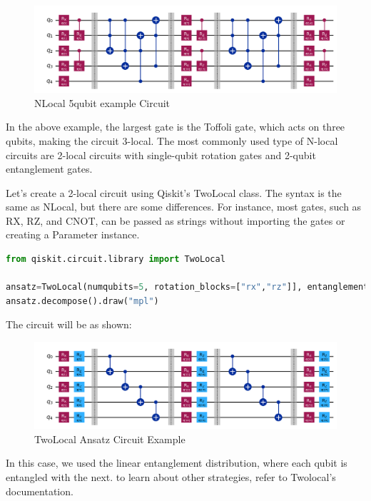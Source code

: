 \documentclass[12pt, oneside]{book}
\theoremstyle{definition}
\theoremstyle{definition}
\theoremstyle{remark}
\begin{document}
\begin{figure}[H]
    \centering
    \includegraphics[width=0.5\linewidth]{../images/5q_ansatz_ex.png}
    \caption{NLocal 5qubit example Circuit}
    \label{fig:5q_ansatz_ex}
\end{figure}

In the above example, the largest gate is the Toffoli gate, which acts on three qubits, making the circuit 3-local. The most commonly used type of N-local circuits are 2-local circuits with single-qubit rotation gates and 2-qubit entanglement gates.

Let's create a 2-local circuit using Qiskit's TwoLocal class. The syntax is the same as NLocal, but there are some differences. For instance, most gates, such as RX, RZ, and CNOT, can be passed as strings without importing the gates or creating a Parameter instance.

\begin{lstlisting}[language=Python]
from qiskit.circuit.library import TwoLocal

ansatz=TwoLocal(numqubits=5, rotation_blocks=["rx","rz"]], entanglement_blocks="cx",entanglement="linear",reps=2,insert_barriers=True,)
ansatz.decompose().draw("mpl")
\end{lstlisting}
The circuit will be as shown:
\begin{figure}[H]
    \centering
    \includegraphics[width=0.5\linewidth]{../images/2local_ansatz.png}
    \caption{TwoLocal Ansatz Circuit Example}
    \label{fig:2local_ansatz}
\end{figure}
In this case, we used the linear entanglement distribution, where each qubit is entangled with the next. to learn about other strategies, refer to Twolocal's documentation.
\end{document}
